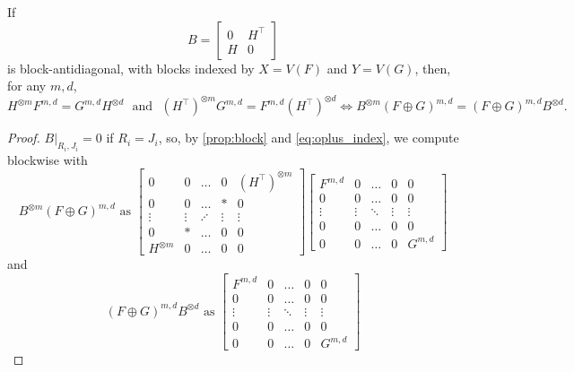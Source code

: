 \documentclass{theoretics}
\begin{document}
\begin{corollary}
\label{cor:off_diag_block}
If
\[
    B = \begin{bmatrix} 0 & H^\top \\ H & 0 \end{bmatrix}
\]
is block-antidiagonal, with blocks indexed by $X = V(F)$ and $Y = V(G)$, then, for any $m,d$,
\[
    H^{\otimes m}F^{m,d} = G^{m,d}H^{\otimes d} \text{~~and~~}
    (H^\top)^{\otimes m}G^{m,d} = F^{m,d}(H^\top)^{\otimes d}
    \iff 
    B^{\otimes m}(F \oplus G)^{m,d} = (F \oplus G)^{m,d}B^{\otimes d}.
\]
\end{corollary}
\begin{proof}
    $B|_{R_i,J_i} = 0$ if $R_i = J_i$, so, by \autoref{prop:block} and \eqref{eq:oplus_index}, 
    we compute blockwise with
    \begin{equation}
        B^{\otimes m}(F \oplus G)^{m,d} \text{ as }
        \begin{bmatrix} 
            0 & 0 & \ldots & 0 & (H^\top)^{\otimes m}\\
            0 & 0 & \ldots & * & 0\\
            \vdots & \vdots & \iddots & \vdots & \vdots \\
            0 & * & \ldots & 0 & 0\\
            H^{\otimes m} & 0 & \ldots & 0 & 0
        \end{bmatrix}
        \begin{bmatrix} 
            F^{m,d} & 0 & \ldots & 0 & 0\\
            0 & 0 &\ldots & 0 & 0\\
            \vdots & \vdots & \ddots & \vdots & \vdots\\
            0 & 0 &\ldots & 0 & 0\\
            0 & 0 & \ldots & 0 & G^{m,d}
        \end{bmatrix}
        \label{eq:hmkmd}
    \end{equation}
    and
    \begin{equation}
        (F \oplus G)^{m,d} B^{\otimes d} \text{ as }
        \begin{bmatrix} 
            F^{m,d} & 0 & \ldots & 0 & 0\\
            0 & 0 &\ldots & 0 & 0\\
            \vdots & \vdots & \ddots & \vdots & \vdots\\
            0 & 0 &\ldots & 0 & 0\\
            0 & 0 & \ldots & 0 & G^{m,d}
        \end{bmatrix}

\end{equation}
\end{proof}
\end{document}
